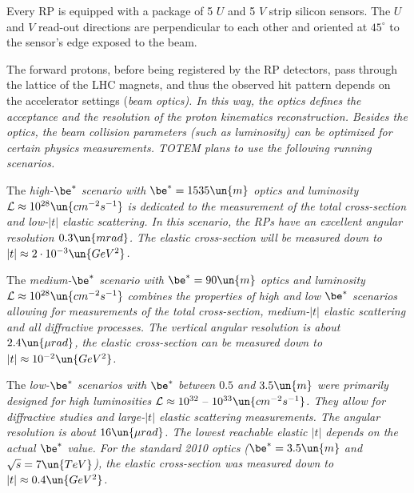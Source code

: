 
Every RP is equipped with a package of 5 $U$ and 5 $V$ strip silicon sensors. The $U$ and $V$ read-out directions are perpendicular to each other and oriented at $45^\circ$ to the sensor's edge exposed to the beam.

The forward protons, before being registered by the RP detectors, pass through the lattice of the LHC magnets, and thus the observed hit pattern depends on the accelerator settings (\em{beam optics}). In this way, the optics defines the acceptance and the resolution of the proton kinematics reconstruction. Besides the optics, the beam collision parameters (such as luminosity) can be optimized for certain physics measurements. TOTEM plans to use the following running scenarios.

\> The \em{high-$\be^*$} scenario with $\be^* = 1535\un{m}$ optics and luminosity ${\cal L} \approx 10^{28} \un{cm^{-2}s^{-1}}$ is dedicated to the measurement of the total cross-section and low-$|t|$ elastic scattering. In this scenario, the RPs have an excellent angular resolution $0.3\un{mrad}$. The elastic cross-section will be measured down to $|t| \approx 2\cdot10^{-3}\un{GeV^2}$.

\> The \em{medium-$\be^*$} scenario with $\be^* = 90\un{m}$ optics and luminosity ${\cal L} \approx 10^{28}\un{cm^{-2}s^{-1}}$ combines the properties of high and low $\be^*$ scenarios allowing for measurements of the total cross-section, medium-$|t|$ elastic scattering and all diffractive processes. The vertical angular resolution is about $2.4\un{\mu rad}$, the elastic cross-section can be measured down to $|t| \approx 10^{-2}\un{GeV^2}$.

\> The \em{low-$\be^*$} scenarios with $\be^*$ between $0.5$ and $3.5\un{m}$ were primarily designed for high luminosities ${\cal L} \approx 10^{32} \hbox{ -- } 10^{33}\un{cm^{-2}s^{-1}}$. They allow for diffractive studies and large-$|t|$ elastic scattering measurements. The angular resolution is about $16\un{\mu rad}$. The lowest reachable elastic $|t|$ depends on the actual $\be^*$ value. For the standard 2010 optics ($\be^* = 3.5\un{m}$ and $\sqrt s = 7\un{TeV}$), the elastic cross-section was measured down to $|t| \approx 0.4\un{GeV^2}$.

